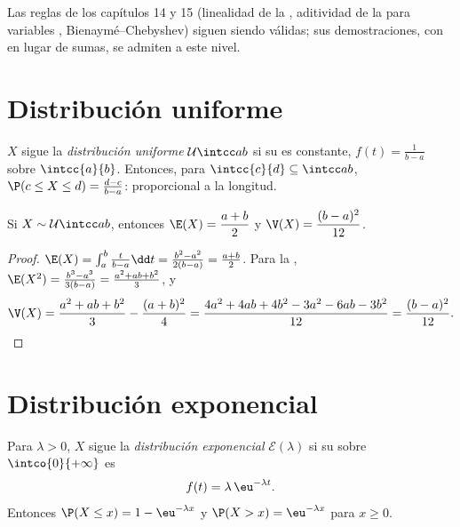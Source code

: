 Las reglas de los capítulos 14 y 15 (linealidad de la ,
aditividad de la  para variables ,
Bienaymé--Chebyshev) siguen siendo válidas; sus demostraciones, con
 en lugar de sumas, se admiten a este nivel.

\section{Distribución uniforme}

\begin{definition}\label{def:g12:contdist:uniform}
$X$ sigue la \emph{distribución uniforme}
$\mathcal U\intcc ab$ si su  es constante,
$f(t) = \frac{1}{b-a}$ sobre $\intcc{a}{b}$. Entonces, para
$\intcc{c}{d} \subseteq \intcc ab$,
$\P(c \leq X \leq d) = \frac{d - c}{b - a}$:  proporcional a la
longitud.
\end{definition}

\begin{proposition}\label{prop:g12:contdist:uniformmoments}
Si $X \sim \mathcal U\intcc ab$, entonces
$\E(X) = \dfrac{a+b}{2}$ y $\V(X) = \dfrac{(b-a)^2}{12}$.
\end{proposition}

\begin{proof}
$\E(X) = \int_a^b \frac{t}{b-a}\dd t
= \frac{b^2 - a^2}{2(b-a)} = \frac{a+b}{2}$. Para la ,
$\E(X^2) = \frac{b^3 - a^3}{3(b-a)} = \frac{a^2 + ab + b^2}{3}$, y
\[
\V(X) = \frac{a^2 + ab + b^2}{3} - \frac{(a+b)^2}{4}
= \frac{4a^2 + 4ab + 4b^2 - 3a^2 - 6ab - 3b^2}{12}
= \frac{(b - a)^2}{12}. \qedhere
\]
\end{proof}

\section{Distribución exponencial}

\begin{definition}\label{def:g12:contdist:expo}
Para $\lambda > 0$, $X$ sigue la \emph{distribución
exponencial} $\mathcal E(\lambda)$ si su
 sobre $\intco{0}{+\infty}$ es
\[
f(t) = \lambda\,\eu^{-\lambda t}.
\]
Entonces $\P(X \leq x) = 1 - \eu^{-\lambda x}$ y
$\P(X > x) = \eu^{-\lambda x}$ para $x \geq 0$.
\end{definition}

